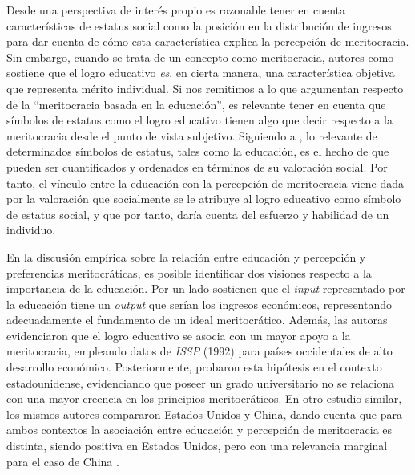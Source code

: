 \documentclass[12pt]{article}
\begin{document}
Desde una perspectiva de interés propio es razonable tener en cuenta características de estatus social como la posición en la distribución de ingresos para dar cuenta de cómo esta característica explica la percepción de meritocracia. Sin embargo, cuando se trata de un concepto como meritocracia, autores como \citet{Goldthorpe2003} sostiene que el logro educativo \textit{es}, en cierta manera, una característica objetiva que representa mérito individual. Si nos remitimos a lo que \citet{Duru-bellat2012} argumentan respecto de la ``meritocracia basada en la educación'', es relevante tener en cuenta que símbolos de estatus como el logro educativo tienen algo que decir respecto a la meritocracia desde el punto de vista subjetivo. Siguiendo a \citet{Jasso2001}, lo relevante de determinados símbolos de estatus, tales como la educación, es el hecho de que pueden ser cuantificados y ordenados en términos de su valoración social. Por tanto, el vínculo entre la educación con la percepción de meritocracia viene dada por la valoración que socialmente se le atribuye al logro educativo como símbolo de estatus social, y que por tanto, daría cuenta del esfuerzo y habilidad de un individuo. 

En la discusión empírica sobre la relación entre educación y percepción y preferencias meritocráticas, es posible identificar dos visiones respecto a la importancia de la educación. Por un lado \citet{Kunovich2007} sostienen que el \textit{input} representado por la educación tiene un \textit{output} que serían los ingresos económicos, representando adecuadamente el fundamento de un ideal meritocrático. Además, las autoras evidenciaron que el logro educativo se asocia con un mayor apoyo a la meritocracia, empleando datos de \textit{ISSP} (1992) para países occidentales de alto desarrollo económico. Posteriormente, \citet{Reynolds2014} probaron esta hipótesis en el contexto estadounidense, evidenciando que poseer un grado universitario no se relaciona con una mayor creencia en los principios meritocráticos. En otro estudio similar, los mismos autores compararon Estados Unidos y China, dando cuenta que para ambos contextos la asociación entre educación y percepción de meritocracia es distinta, siendo positiva en Estados Unidos, pero con una relevancia marginal para el caso de China \citep{Xian2017}. 
\end{document}
